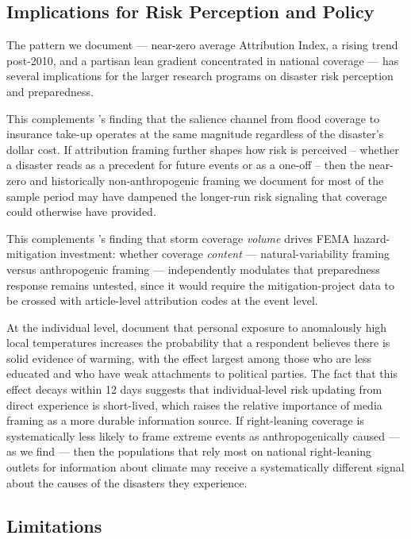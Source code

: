 \documentclass[12pt]{article}
\begin{document}
\subsection*{Implications for Risk Perception and Policy}

The pattern we document --- near-zero average Attribution Index, a
rising trend post-2010, and a partisan lean gradient concentrated in
national coverage --- has several implications for the larger research
programs on disaster risk perception and preparedness.

This complements \citet{gallagher2014}'s finding that the salience
channel from flood coverage to insurance take-up operates at the same
magnitude regardless of the disaster's dollar cost.  If attribution
framing further shapes how risk is perceived -- whether a disaster
reads as a precedent for future events or as a one-off -- then the
near-zero and historically non-anthropogenic framing we document for
most of the sample period may have dampened the longer-run risk
signaling that coverage could otherwise have provided.

This complements \citet{magontier2020}'s finding that storm coverage
\emph{volume} drives FEMA hazard-mitigation investment: whether coverage
\emph{content} --- natural-variability framing versus anthropogenic
framing --- independently modulates that preparedness response remains
untested, since it would require the mitigation-project data to be
crossed with article-level attribution codes at the event level.

At the individual level, \citet{egan2012} document that personal
exposure to anomalously high local temperatures increases the
probability that a respondent believes there is solid evidence of
warming, with the effect largest among those who are less educated and
who have weak attachments to political parties.  The fact that this
effect decays within 12 days suggests that individual-level risk
updating from direct experience is short-lived, which raises the
relative importance of media framing as a more durable information
source.  If right-leaning coverage is systematically less likely to
frame extreme events as anthropogenically caused --- as we find --- then
the populations that rely most on national right-leaning outlets for
information about climate may receive a systematically different signal
about the causes of the disasters they experience.

\subsection*{Limitations}
\end{document}
